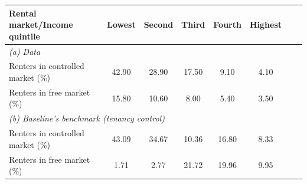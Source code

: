\begin{table}[p]
\footnotesize
\renewcommand{\arraystretch}{1.2}
\begin{center}
\begin{tabular}{lccccccc}
\toprule
Rental market/Income quintile & Lowest & Second & Third & Fourth & Highest\\ 
\midrule
\multicolumn{6}{l}{\textit{(a) Data}}\\
Renters in controlled market (\%) & 42.90 & 28.90 & 17.50 &	9.10 & 4.10\\
Renters in free market (\%) & 15.80 & 10.60 & 8.00 & 5.40 & 3.50 \\
\multicolumn{6}{l}{\textit{(b) Baseline's benchmark (tenancy control)}}\\
Renters in controlled market (\%) & 43.09 & 34.67 & 10.36 & 16.80 & 8.33 \\
Renters in free market (\%) & 1.71 & 2.77 & 21.72 & 19.96 & 9.95 \\
\bottomrule
\end{tabular}
\end{center}
\normalsize
\end{table}
